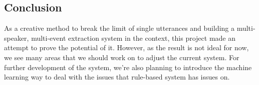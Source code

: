 \subsection{Conclusion}

As a creative method to break the limit of single utterances and building a
multi-speaker, multi-event extraction system in the context, this project made
an attempt to prove the potential of it. However, as the result is not ideal
for now, we see many areas that we should work on to adjust the current system.
For further development of the system, we’re also planning to introduce the
machine learning way to deal with the issues that rule-based system has issues
on. 

